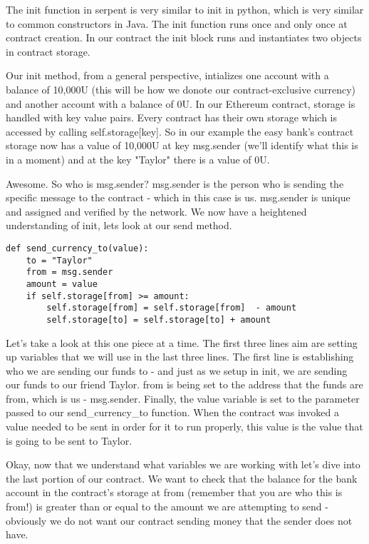 \documentclass[12pt]{article}
\begin{document}
The init function in serpent is very similar to init in python, which is very similar to common constructors in Java. The init function runs once and only once at contract creation. In our contract the init block runs and instantiates two objects in contract storage.
 
Our init method, from a general perspective, intializes one account with a balance of 10,000U (this will be how we donote our contract-exclusive currency) and another account with a balance of 0U. In our Ethereum contract, storage is handled with key value pairs. Every contract has their own storage which is accessed by calling self.storage[key]. So in our example the easy bank's contract storage now has a value of 10,000U at key msg.sender (we'll identify what this is in a moment) and at the key "Taylor" there is a value of 0U. 

 Awesome. So who is msg.sender? msg.sender is the person who is sending the specific message to the contract - which in this case is us. msg.sender is unique and assigned and verified by the network. We now have a heightened understanding of init, lets look at our send method.



\begin{lstlisting}
def send_currency_to(value):
	to = "Taylor"
	from = msg.sender
	amount = value
	if self.storage[from] >= amount:
		self.storage[from] = self.storage[from]  - amount
		self.storage[to] = self.storage[to] + amount
\end{lstlisting}

Let's take a look at this one piece at a time. The first three lines aim are setting up variables that we will use in the last three lines. The first line is establishing who we are sending our funds to - and just as we setup in init, we are sending our funds to our friend Taylor. 
from is being set to the address that the funds are from, which is us - msg.sender. Finally, the value variable is set to the parameter passed to our send\_currency\_to function. When the contract was invoked a value needed to be sent in order for it to run properly, this value is the value that is going to be sent to Taylor.

Okay, now that we understand what variables we are working with let's dive into the last portion of our contract. We want to check that the balance for the bank account in the contract's storage at from (remember that you are who this is from!) is greater than or equal to the amount we are attempting to send - obviously we do not want our contract sending money that the sender does not have.
\end{document}
